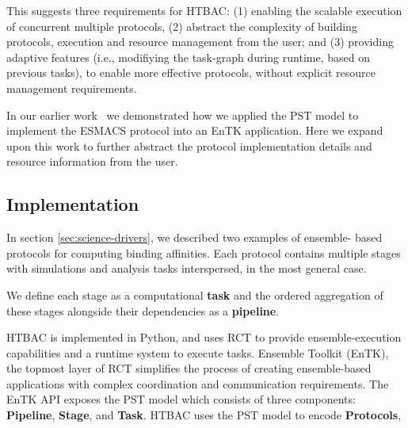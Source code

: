 This suggests three requirements for HTBAC\@: (1) enabling the scalable
execution of concurrent multiple protocols, (2) abstract the complexity of
building protocols, execution and resource management from the user; and (3)
providing adaptive features (i.e., modifiying the task-graph during runtime,
based on previous tasks), to enable more effective protocols, without explicit
resource management requirements.


	In our earlier work~\cite{dakka2017} we demonstrated how we applied the
PST model to implement the ESMACS protocol into an EnTK application. Here we
expand upon this work to further abstract the protocol implementation details
and resource information from the user. 


\subsection{Implementation}

In section \ref{sec:science-drivers}, we described two examples of ensemble-
based protocols for computing binding affinities. Each protocol contains
multiple stages with simulations and analysis tasks interspersed, in the most
general case.



We define each stage as a computational \textbf{task} and the ordered
aggregation of these stages alongside their dependencies as a
\textbf{pipeline}.

HTBAC is implemented in Python, and uses RCT to provide ensemble-execution
capabilities and a runtime system to execute tasks. Ensemble Toolkit (EnTK),
the topmost layer of RCT simplifies the process of creating ensemble-based
applications with complex coordination and communication requirements. The
EnTK API exposes the PST model which consists of three components:
\textbf{Pipeline}, \textbf{Stage}, and \textbf{Task}. HTBAC uses the PST model
to encode \textbf{Protocols},

